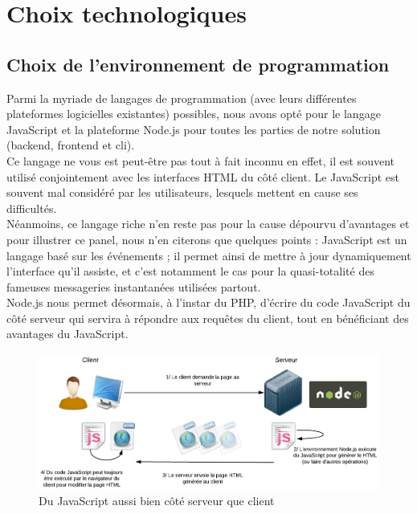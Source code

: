 \section{Choix technologiques}
\label{section:choixTechnologiques}

\subsection*{Choix de l'environnement de programmation}

Parmi la myriade de langages de programmation (avec leurs différentes plateformes logicielles existantes) possibles, nous avons opté pour le langage JavaScript et la plateforme Node.js pour toutes les parties de notre solution (\gls{backend}, \gls{frontend} et \Gls{cli}). \\

Ce langage ne vous est peut-être pas tout à fait inconnu en effet, il est souvent utilisé conjointement avec les interfaces HTML du côté client. Le JavaScript est souvent mal considéré par les utilisateurs, lesquels mettent en cause ses difficultés. \\

Néanmoins, ce langage riche n’en reste pas pour la cause dépourvu d’avantages et pour illustrer ce panel, nous n'en citerons que quelques points : JavaScript est un langage basé sur les événements ; il permet ainsi de mettre à jour dynamiquement l’interface qu’il assiste, et c’est notamment le cas pour la quasi-totalité des fameuses messageries instantanées utilisées partout.\\

Node.js nous permet désormais, à l'instar du PHP, d'écrire du code JavaScript du côté serveur qui servira à répondre aux requêtes du client, tout en bénéficiant des avantages du JavaScript. \\

\begin{figure}[H]
    \includegraphics[width=\textwidth,height=0.24\textheight,keepaspectratio]{images/SchemaNodejs.png}
    \centering
    \caption[Du JavaScript aussi bien côté serveur que client]{Du JavaScript aussi bien côté serveur que client~\cite{NodejsIllustrations}}
    \label{pic:WhatIsNodeJs}
\end{figure}

